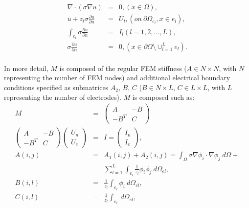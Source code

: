 \documentclass[fleqn,11pt,openany]{book}
\begin{document}
\begin{center}
\begin{eqnarray*}
     \nabla \cdot (\sigma \nabla u) & = & 0 ,(x \in \Omega), \\
     u + z_{l} \sigma \frac{\partial u}{\partial n} & = & 
     U_{l} , (on\ \partial \Omega_{e_{l}},x \in e_{l}),\\ 
     \int_{e_{l}} \sigma \frac{\partial u}{\partial n} & = & 
     I_{l} (l = 1,2,...,L), \\
      \sigma \frac{\partial u}{\partial n} & = & 
      0, (x \in \partial \Omega \setminus  \cup^{L}_{l=1} e_{l}). \\
\end{eqnarray*}
\end{center}

In more detail, $M$ is composed of the regular FEM stiffness ($A \in N \times N$, with $N$ representing the number of FEM nodes) and additional electrical boundary conditions specified as submatrices $A_{2}$,
$B$, $C$ ($B \in N \times L$, $C \in L \times L$, with $L$ representing the number of electrodes).
$M$ is composed such as: \\

\begin{eqnarray}
M &=& \left( \begin{array}{cc}
A & -B \\
-B^{T} & C
\end{array} \right) \nonumber \\
\left( \begin{array}{cc}
A & -B \\
-B^{T} & C
\end{array} \right) 
\left(
\begin{array}{c}
U_{n} \\
U_{e}
\end{array}
\right) &=& I =
\left(
\begin{array}{c}
I_{n} \\
I_{e}
\end{array}
\right) \nonumber, \\
A(i,j) &=& A_{1}(i,j) + A_{2}(i,j) = \int_{\Omega} \sigma \nabla \phi_{i} \cdot \nabla
\phi_{j}\ d\Omega + \nonumber \\
& & \sum_{l=1}^{L} \int_{e_{l}} \frac{1}{z_l} \phi_{i}
\phi_{j}\ d\Omega_{el}, \nonumber \\
B(i,l) &=& \frac{1}{z_{l}} \int_{e_l} \phi_{i}\ d\Omega_{el}
\nonumber, \\
C(i,l) &=& \frac{1}{z_{l}} \int_{e_l}\ d\Omega_{el}, \nonumber \\ \nonumber \\
\end{eqnarray}
\end{document}
